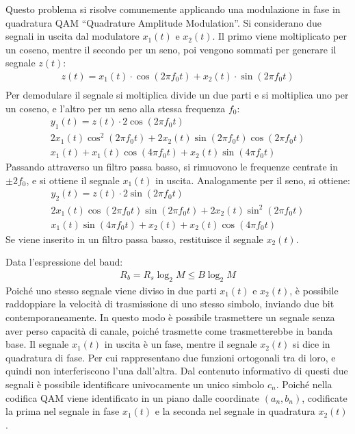 \documentclass{article}
\numberwithin{equation}{subsection}
\begin{document}
Questo problema si risolve comunemente applicando una modulazione in fase in quadratura QAM ``Quadrature Amplitude Modulation''. 
Si considerano due segnali in uscita dal modulatore $x_1(t)$ e $x_2(t)$. 
Il primo viene moltiplicato per un coseno, mentre il secondo per un 
seno, poi vengono sommati per generare il segnale $z(t)$:
\begin{gather*}
    z(t)=x_1(t)\cdot\cos(2\pi f_0t)+x_2(t)\cdot\sin(2\pi f_0t)\\
\end{gather*}
Per demodulare il segnale si moltiplica divide un due parti e si moltiplica uno per un coseno, e l'altro per un seno alla stessa frequenza $f_0$:
\begin{gather*}
    y_1(t)=z(t)\cdot2\cos(2\pi f_0t)\\
    2x_1(t)\cos^2(2\pi f_0t)+2x_2(t)\sin(2\pi f_0t)\cos(2\pi f_0t)\\
    x_1(t)+x_1(t)\cos(4\pi f_0t)+x_2(t)\sin(4\pi f_0t)
\end{gather*}
Passando attraverso un filtro passa basso, si rimuovono le frequenze centrate in $\pm 2f_0$, e si ottiene il segnale $x_1(t)$ in uscita. 
Analogamente per il seno, si ottiene:
\begin{gather*}
    y_2(t)=z(t)\cdot2\sin(2\pi f_0t)\\
    2x_1(t)\cos(2\pi f_0t)\sin(2\pi f_0t)+2x_2(t)\sin^2(2\pi f_0t)\\
    x_1(t)\sin(4\pi f_0t)+x_2(t)+x_2(t)\cos(4\pi f_0t)
\end{gather*}
Se viene inserito in un filtro passa basso, restituisce il segnale $x_2(t)$. 

Data l'espressione del baud:
\begin{gather*}
    R_b=R_s\log_2M\leq B\log_2M
\end{gather*}
Poiché uno stesso segnale viene diviso in due parti $x_1(t)$ e $x_2(t)$, è possibile raddoppiare la velocità di trasmissione di uno stesso simbolo, 
inviando due bit contemporaneamente. 
In questo modo è possibile trasmettere un segnale senza aver perso capacità di canale, poiché trasmette come trasmetterebbe in banda base. Il segnale $x_1(t)$ in 
uscita è un fase, mentre il segnale $x_2(t)$ si dice in quadratura di fase. Per cui rappresentano due funzioni ortogonali tra di loro, e quindi non interferiscono l'una 
dall'altra. Dal contenuto informativo di questi due segnali è possibile identificare univocamente un unico simbolo $c_n$. Poiché nella codifica QAM viene identificato in un piano 
dalle coordinate $(a_n,b_n)$, codificate la prima nel segnale in fase $x_1(t)$ e la seconda nel segnale in quadratura $x_2(t)$. 
\end{document}
